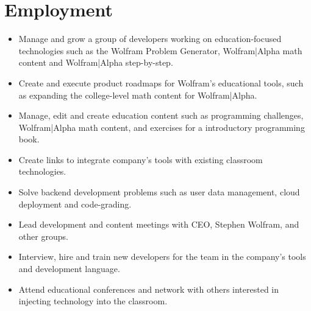 \documentclass[11pt,a4paper,unicode]{moderncv}
\begin{document}
\vspace*{-6mm}
\maketitle
\vspace*{-6mm}

\section{Employment}

\cvline{}
{\begin{itemize} 
	  \item Manage and grow a group of developers working on education-focused technologies such as the Wolfram Problem Generator, Wolfram|Alpha math content and Wolfram|Alpha step-by-step. 
	  \item Create and execute product roadmaps for Wolfram's educational tools, such as expanding the college-level math content for Wolfram|Alpha.
	  \item Manage, edit and create education content such as programming challenges, Wolfram|Alpha math content, and exercises for a introductory programming book. 
	  \item Create links to integrate company's tools with existing classroom technologies.
	  \item Solve backend development problems such as user data management, cloud deployment and code-grading. 
	  \item Lead development and content meetings with CEO, Stephen Wolfram, and other groups.
	  \item Interview, hire and train new developers for the team in the company's tools and development language. 
	  \item Attend educational conferences and network with others interested in injecting technology into the classroom. 
 \end{itemize}}
	 
\vspace{-.5cm}
\end{document}
